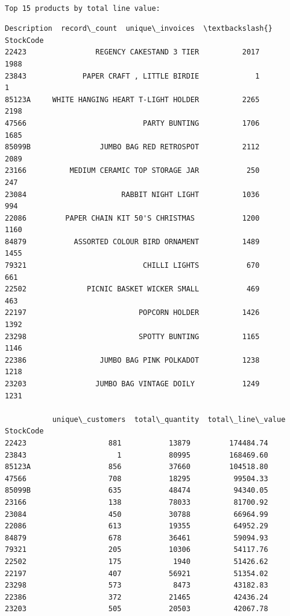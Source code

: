 \documentclass[11pt]{article}
\begin{document}
    
    \begin{Verbatim}[commandchars=\\\{\}]

Top 15 products by total line value:
    \end{Verbatim}

    
    \begin{Verbatim}[commandchars=\\\{\}]
                                  Description  record\_count  unique\_invoices  \textbackslash{}
StockCode                                                                      
22423                REGENCY CAKESTAND 3 TIER          2017             1988   
23843             PAPER CRAFT , LITTLE BIRDIE             1                1   
85123A     WHITE HANGING HEART T-LIGHT HOLDER          2265             2198   
47566                           PARTY BUNTING          1706             1685   
85099B                JUMBO BAG RED RETROSPOT          2112             2089   
23166          MEDIUM CERAMIC TOP STORAGE JAR           250              247   
23084                      RABBIT NIGHT LIGHT          1036              994   
22086         PAPER CHAIN KIT 50'S CHRISTMAS           1200             1160   
84879           ASSORTED COLOUR BIRD ORNAMENT          1489             1455   
79321                           CHILLI LIGHTS           670              661   
22502              PICNIC BASKET WICKER SMALL           469              463   
22197                          POPCORN HOLDER          1426             1392   
23298                          SPOTTY BUNTING          1165             1146   
22386                 JUMBO BAG PINK POLKADOT          1238             1218   
23203                JUMBO BAG VINTAGE DOILY           1249             1231   

           unique\_customers  total\_quantity  total\_line\_value  
StockCode                                                      
22423                   881           13879         174484.74  
23843                     1           80995         168469.60  
85123A                  856           37660         104518.80  
47566                   708           18295          99504.33  
85099B                  635           48474          94340.05  
23166                   138           78033          81700.92  
23084                   450           30788          66964.99  
22086                   613           19355          64952.29  
84879                   678           36461          59094.93  
79321                   205           10306          54117.76  
22502                   175            1940          51426.62  
22197                   407           56921          51354.02  
23298                   573            8473          43182.83  
22386                   372           21465          42436.24  
23203                   505           20503          42067.78  
    \end{Verbatim}
\end{document}

